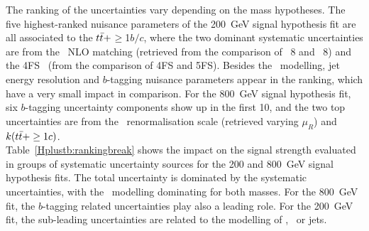 The ranking of the uncertainties vary depending on the mass hypotheses. The five highest-ranked nuisance parameters of the 200~GeV signal hypothesis fit are all associated to the $t\bar{t}+$$\geq$1$b/c$, where the two dominant systematic uncertainties are from the \ttb\ NLO matching (retrieved from the comparison of \MGMCatNLOPYTHIA~8 and \POWHEGPYTHIA~8) and the 4FS \ttb\ (from the comparison of 4FS and 5FS). Besides the \ttbar\ modelling, jet energy resolution and $b$-tagging nuisance parameters appear in the ranking, which have a very small impact in comparison. For the 800~GeV signal hypothesis fit, six $b$-tagging uncertainty components show up in the first 10, and the two top uncertainties are from the \ttb\ renormalisation scale (retrieved varying $\mu_R$) and $k(t\bar{t}+\geq1c)$.\\

Table~\ref{Hplustb:rankingbreak} shows the impact on the signal strength evaluated in groups of systematic uncertainty sources for the 200 and 800~GeV signal hypothesis fits. The total uncertainty is dominated by the systematic uncertainties, with the \ttb\ modelling dominating for both masses. For the 800~GeV fit, the $b$-tagging related uncertainties play also a leading role. For the 200~GeV fit, the sub-leading uncertainties are related to the modelling of \ttc, \ttl\ or jets.\\

